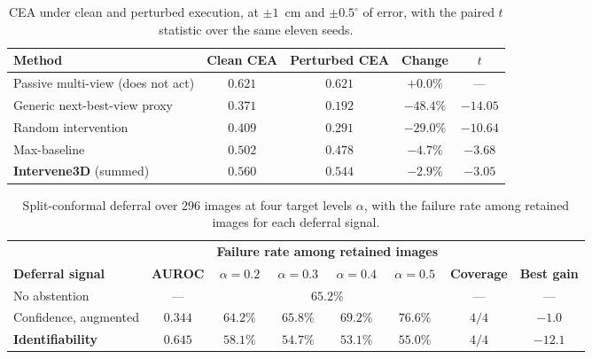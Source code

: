 \documentclass{article} %
\theoremstyle{defstyle}
\theoremstyle{plain}
\begin{document}
\begin{table}[htb]
\caption{CEA under clean and perturbed execution, at $\pm 1$~cm and $\pm 0.5^{\circ}$ of error, with the paired $t$ statistic over the same eleven seeds.}
\label{tab:noise}
\begin{center}
\scriptsize
\begin{tabular}{lcccc}
\toprule
\textbf{Method} & \textbf{Clean CEA} & \textbf{Perturbed CEA} & \textbf{Change} & \textbf{$t$} \\
\midrule
Passive multi-view (does not act) & $0.621$ & $0.621$ & $+0.0\%$ & --- \\
Generic next-best-view proxy   & $0.371$ & $0.192$ & $-48.4\%$ & $-14.05$ \\
Random intervention & $0.409$ & $0.291$ & $-29.0\%$ & $-10.64$ \\
Max-baseline        & $0.502$ & $0.478$ & $-4.7\%$  & $-3.68$ \\
\textbf{Intervene3D} (summed) & $0.560$ & $0.544$ & $\mathbf{-2.9\%}$ & $-3.05$ \\
\bottomrule
\end{tabular}
\end{center}
\end{table}

\begin{table}[htb]
\caption{Split-conformal deferral over $296$ images at four target levels $\alpha$, with the failure rate among retained images for each deferral signal.}
\label{tab:conformal}
\begin{center}
\scriptsize \setlength{\tabcolsep}{3.2pt}
\begin{tabular}{lccccccc}
\toprule
& & \multicolumn{4}{c}{\textbf{Failure rate among retained images}} & & \\
\cmidrule(lr){3-6}
\textbf{Deferral signal} & \textbf{AUROC} & $\alpha{=}0.2$ & $\alpha{=}0.3$ &
$\alpha{=}0.4$ & $\alpha{=}0.5$ & \textbf{Coverage} & \textbf{Best gain} \\
\midrule
No abstention            & ---     & \multicolumn{4}{c}{$65.2\%$} & --- & --- \\
Confidence, augmented & $0.344$ & $64.2\%$ & $65.8\%$ & $69.2\%$ & $76.6\%$ & $4/4$ & $-1.0$ \\
\textbf{Identifiability} & $\mathbf{0.645}$ & $58.1\%$ & $54.7\%$ & $\mathbf{53.1\%}$ & $55.0\%$ & $4/4$ & $\mathbf{-12.1}$ \\
\bottomrule
\end{tabular}
\end{center}
\end{table}
\end{document}
